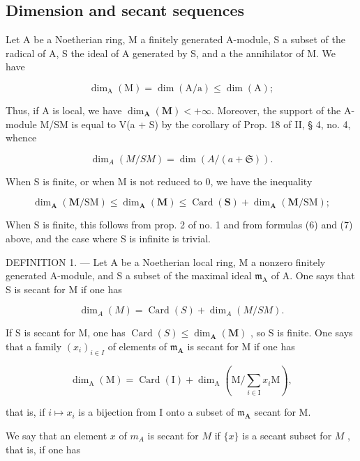 \subsection{Dimension and secant sequences}

Let A be a Noetherian ring, M a finitely generated A-module, S a subset of the radical of A, S the ideal of A generated by S, and a the annihilator of M. We have

\[
\dim_ {\mathrm{A}} (\mathrm{M}) = \dim (\mathrm{A} / \mathrm{a}) \leqslant \dim (\mathrm{A});\tag{6}
\]

Thus, if A is local, we have \(\dim_{\mathbf{A}}(\mathbf{M}) < +\infty\). Moreover, the support of the A-module M/SM is equal to V(a + S) by the corollary of Prop. 18 of II, § 4, no. 4, whence

\[
\dim_ {A} (M / S M) = \dim (A / (a + \mathfrak {S}))  .\tag{7}
\]

When S is finite, or when M is not reduced to 0, we have the inequality

\[
\dim_ {\mathbf {A}} (\mathbf {M} / \mathrm{SM}) \leqslant \dim_ {\mathbf {A}} (\mathbf {M}) \leqslant \operatorname{Card} (\mathbf {S}) + \dim_ {\mathbf {A}} (\mathbf {M} / \mathrm{SM});\tag{8}
\]

When S is finite, this follows from prop. 2 of no. 1 and from formulas (6) and (7) above, and the case where S is infinite is trivial.

DEFINITION 1. --- Let A be a Noetherian local ring, M a nonzero finitely generated A-module, and S a subset of the maximal ideal \(\mathfrak{m}_{\mathrm{A}}\) of A. One says that S is secant for M if one has

\[
\dim_ {A} (M) = \operatorname{Card} (S) + \dim_ {A} (M / S M).\tag{9}
\]

If S is secant for M, one has \(\operatorname{Card}(S) \leqslant \dim_{\mathbf{A}}(\mathbf{M})\) , so S is finite. One says that a family \((x_i)_{i \in I}\) of elements of \(\mathfrak{m}_{\mathbf{A}}\) is secant for M if one has

\[
\dim_ {\mathrm{A}} (\mathrm{M}) = \operatorname{Card} (\mathrm{I}) + \dim_ {\mathrm{A}} \left(\mathrm{M} / \sum_ {i \in \mathrm{I}} x _ {i} \mathrm{M}\right),\tag{10}
\]

that is, if \(i\mapsto x_{i}\) is a bijection from I onto a subset of \(\mathfrak{m}_{\mathbf{A}}\) secant for M.

We say that an element \(x\) of \(m_A\) is secant for \(M\) if \(\{x\}\) is a secant subset for \(M\) , that is, if one has

